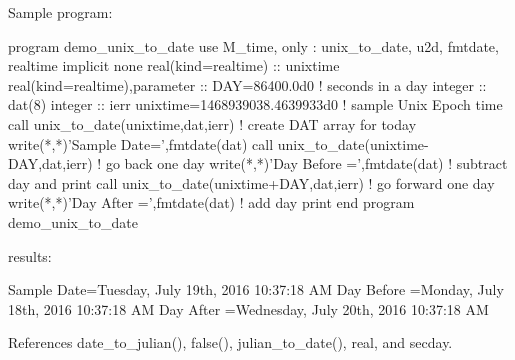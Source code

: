 \begin{DoxyVerb}
\begin{DoxyVerb}Sample program:

 program demo_unix_to_date
 use M_time, only : unix_to_date, u2d, fmtdate, realtime
 implicit none
 real(kind=realtime)           :: unixtime
 real(kind=realtime),parameter :: DAY=86400.0d0 ! seconds in a day
 integer                       :: dat(8)
 integer                       :: ierr
    unixtime=1468939038.4639933d0            ! sample Unix Epoch time
    call unix_to_date(unixtime,dat,ierr)     ! create DAT array for today
    write(*,*)'Sample Date=',fmtdate(dat)
    call unix_to_date(unixtime-DAY,dat,ierr) ! go back one day
    write(*,*)'Day Before =',fmtdate(dat)    ! subtract day and print
    call unix_to_date(unixtime+DAY,dat,ierr) ! go forward one day
    write(*,*)'Day After  =',fmtdate(dat)    ! add day print
 end program demo_unix_to_date

results:

 Sample Date=Tuesday, July 19th, 2016 10:37:18 AM
 Day Before =Monday, July 18th, 2016 10:37:18 AM
 Day After  =Wednesday, July 20th, 2016 10:37:18 AM \end{DoxyVerb}
 

References date\+\_\+to\+\_\+julian(), false(), julian\+\_\+to\+\_\+date(), real, and secday.


\end{DoxyVerb}
